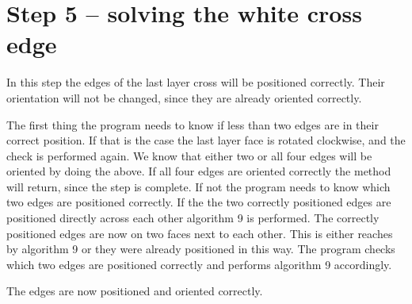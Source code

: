 \section{Step 5 -- solving the white cross edge}
In this step the edges of the last layer cross will be positioned correctly. Their orientation will not be changed, since they are already oriented correctly.

The first thing the program needs to know if less than two edges are in their correct position. 
If that is the case the last layer face is rotated clockwise, and the check is performed again. 
We know that either two or all four edges will be oriented by doing the above. 
If all four edges are oriented correctly the method will return, since the step is complete.
If not the program needs to know which two edges are positioned correctly.
If the the two correctly positioned edges are positioned directly across each other algorithm 9 is performed.
The correctly positioned edges are now on two faces next to each other. This is either reaches by algorithm 9 or they were already positioned in this way.
The program checks which two edges are positioned correctly and performs algorithm 9 accordingly. 

The edges are now positioned and oriented correctly.